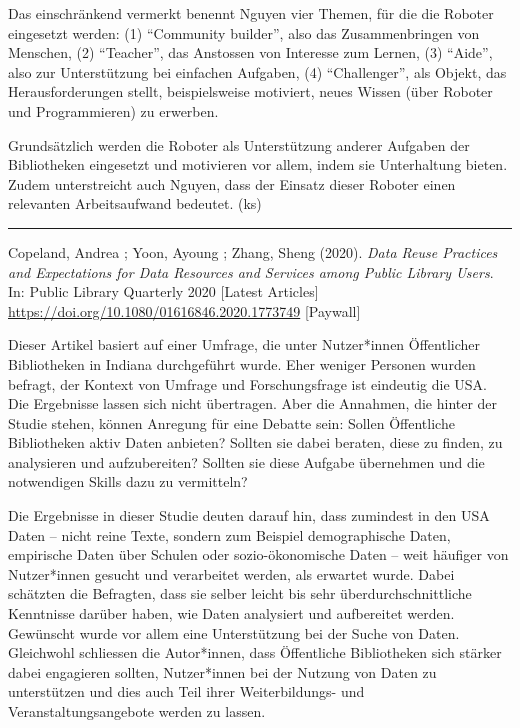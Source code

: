 \documentclass[a4paper,
fontsize=11pt,
oneside,
numbers=noperiodatend,
parskip=half-,
bibliography=totoc,
final
]{scrartcl}
\begin{document}
Das einschränkend vermerkt benennt Nguyen vier Themen, für die die
Roboter eingesetzt werden: (1) \enquote{Community builder}, also das
Zusammenbringen von Menschen, (2) \enquote{Teacher}, das Anstossen von
Interesse zum Lernen, (3) \enquote{Aide}, also zur Unterstützung bei
einfachen Aufgaben, (4) \enquote{Challenger}, als Objekt, das
Herausforderungen stellt, beispielsweise motiviert, neues Wissen (über
Roboter und Programmieren) zu erwerben.

Grundsätzlich werden die Roboter als Unterstützung anderer Aufgaben der
Bibliotheken eingesetzt und motivieren vor allem, indem sie Unterhaltung
bieten. Zudem unterstreicht auch Nguyen, dass der Einsatz dieser Roboter
einen relevanten Arbeitsaufwand bedeutet. (ks)

\begin{center}\rule{0.5\linewidth}{0.5pt}\end{center}

Copeland, Andrea ; Yoon, Ayoung ; Zhang, Sheng (2020). \emph{Data Reuse
Practices and Expectations for Data Resources and Services among Public
Library Users}. In: Public Library Quarterly 2020 {[}Latest Articles{]}
\url{https://doi.org/10.1080/01616846.2020.1773749} {[}Paywall{]}

Dieser Artikel basiert auf einer Umfrage, die unter Nutzer*innen
Öffentlicher Bibliotheken in Indiana durchgeführt wurde. Eher weniger
Personen wurden befragt, der Kontext von Umfrage und Forschungsfrage ist
eindeutig die USA. Die Ergebnisse lassen sich nicht übertragen. Aber die
Annahmen, die hinter der Studie stehen, können Anregung für eine Debatte
sein: Sollen Öffentliche Bibliotheken aktiv Daten anbieten? Sollten sie
dabei beraten, diese zu finden, zu analysieren und aufzubereiten?
Sollten sie diese Aufgabe übernehmen und die notwendigen Skills dazu zu
vermitteln?

Die Ergebnisse in dieser Studie deuten darauf hin, dass zumindest in den
USA Daten -- nicht reine Texte, sondern zum Beispiel demographische
Daten, empirische Daten über Schulen oder sozio-ökonomische Daten --
weit häufiger von Nutzer*innen gesucht und verarbeitet werden, als
erwartet wurde. Dabei schätzten die Befragten, dass sie selber leicht
bis sehr überdurchschnittliche Kenntnisse darüber haben, wie Daten
analysiert und aufbereitet werden. Gewünscht wurde vor allem eine
Unterstützung bei der Suche von Daten. Gleichwohl schliessen die
Autor*innen, dass Öffentliche Bibliotheken sich stärker dabei engagieren
sollten, Nutzer*innen bei der Nutzung von Daten zu unterstützen und dies
auch Teil ihrer Weiterbildungs- und Veranstaltungsangebote werden zu
lassen.
\end{document}
